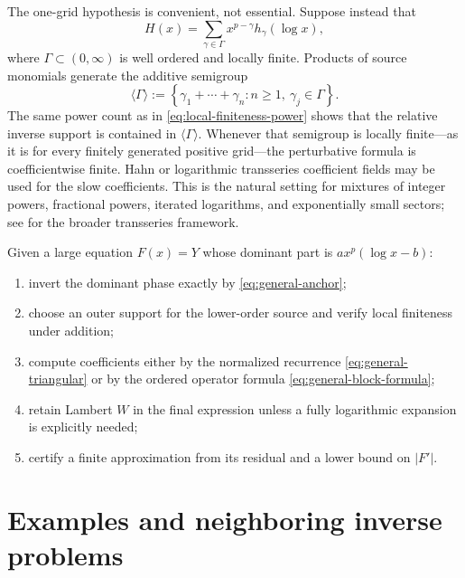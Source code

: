 \documentclass[11pt,oneside]{article}
\theoremstyle{plain}
\theoremstyle{definition}
\theoremstyle{remark}
\begin{document}
The one-grid hypothesis is convenient, not essential.  Suppose instead that
\begin{equation}
 H(x)=\sum_{\gamma\in\Gamma}
 x^{p-\gamma}h_\gamma(\log x),
 \label{eq:multigrid-source}
\end{equation}
where \(\Gamma\subset(0,\infty)\) is well ordered and locally finite.  Products
of source monomials generate the additive semigroup
\begin{equation}
 \langle\Gamma\rangle
 :=\left\{\gamma_1+\cdots+\gamma_n:
 n\ge1,\ \gamma_j\in\Gamma\right\}.
 \label{eq:additive-support}
\end{equation}
The same power count as in \cref{eq:local-finiteness-power} shows that the
relative inverse support is contained in \(\langle\Gamma\rangle\).  Whenever
that semigroup is locally finite---as it is for every finitely generated
positive grid---the perturbative formula is coefficientwise finite.  Hahn or
logarithmic transseries coefficient fields may be used for the slow
coefficients.  This is the natural setting for mixtures of integer powers,
fractional powers, iterated logarithms, and exponentially small sectors; see
\cite{vanDerHoeven2006,ADH2017} for the broader transseries framework.

\begin{methodbox}[title={General Lambert-grid inversion recipe}]
Given a large equation \(F(x)=Y\) whose dominant part is
\(a x^p(\log x-b)\):
\begin{enumerate}
 \item invert the dominant phase exactly by \cref{eq:general-anchor};
 \item choose an outer support for the lower-order source and verify local
       finiteness under addition;
 \item compute coefficients either by the normalized recurrence
       \cref{eq:general-triangular} or by the ordered operator formula
       \cref{eq:general-block-formula};
 \item retain Lambert \(W\) in the final expression unless a fully logarithmic
       expansion is explicitly needed;
 \item certify a finite approximation from its residual and a lower bound on
       \(|F'|\).
\end{enumerate}
\end{methodbox}

\section{Examples and neighboring inverse problems}
\label{sec:examples}
\end{document}
